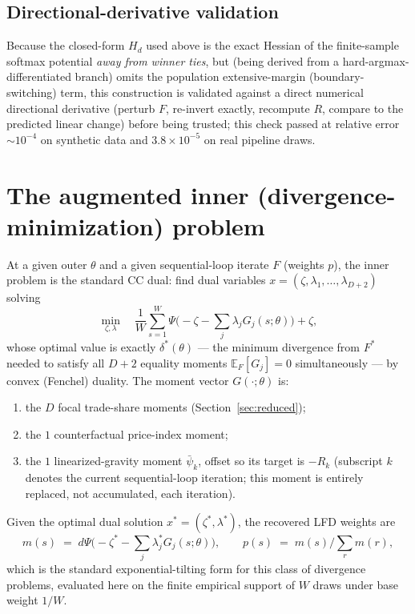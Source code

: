 \documentclass[11pt]{article}
\newcommand{\E}{\mathbb{E}}
\begin{document}
\subsection{Directional-derivative validation}
Because the closed-form $H_d$ used above is the exact Hessian of the finite-sample softmax
potential \emph{away from winner ties}, but (being derived from a hard-argmax-differentiated
branch) omits the population extensive-margin (boundary-switching) term, this construction is
validated against a direct numerical directional derivative (perturb $F$, re-invert exactly,
recompute $R$, compare to the predicted linear change) before being trusted; this check passed at
relative error $\sim\!10^{-4}$ on synthetic data and $3.8\times10^{-5}$ on real pipeline draws.

\section{The augmented inner (divergence-minimization) problem}
\label{sec:inner}

At a given outer $\theta$ and a given sequential-loop iterate $F$ (weights $p$), the inner problem
is the standard CC dual: find dual variables $x=(\zeta,\lambda_1,\dots,\lambda_{D+2})$ solving
\[
\min_{\zeta,\lambda}\quad \frac{1}{W}\sum_{s=1}^{W}\Psi\!\Big(-\zeta-\textstyle\sum_j \lambda_j G_j(s;\theta)\Big) + \zeta,
\]
whose optimal value is exactly $\delta^*(\theta)$ — the minimum divergence from $F^*$ needed to
satisfy all $D+2$ equality moments $\E_F[G_j]=0$ simultaneously — by convex (Fenchel) duality. The
moment vector $G(\cdot;\theta)$ is:
\begin{enumerate}
  \item the $D$ focal trade-share moments (Section~\ref{sec:reduced});
  \item the $1$ counterfactual price-index moment;
  \item the $1$ linearized-gravity moment $\bar\psi_k$, offset so its target is $-R_k$ (subscript
  $k$ denotes the current sequential-loop iteration; this moment is entirely replaced, not
  accumulated, each iteration).
\end{enumerate}
Given the optimal dual solution $x^*=(\zeta^*,\lambda^*)$, the recovered LFD weights are
\[
m(s) \;=\; d\Psi\big(-\zeta^*-\textstyle\sum_j\lambda_j^* G_j(s;\theta)\big), \qquad
p(s) \;=\; m(s)\Big/\textstyle\sum_r m(r),
\]
which is the standard exponential-tilting form for this class of divergence problems, evaluated
here on the finite empirical support of $W$ draws under base weight $1/W$.
\end{document}
